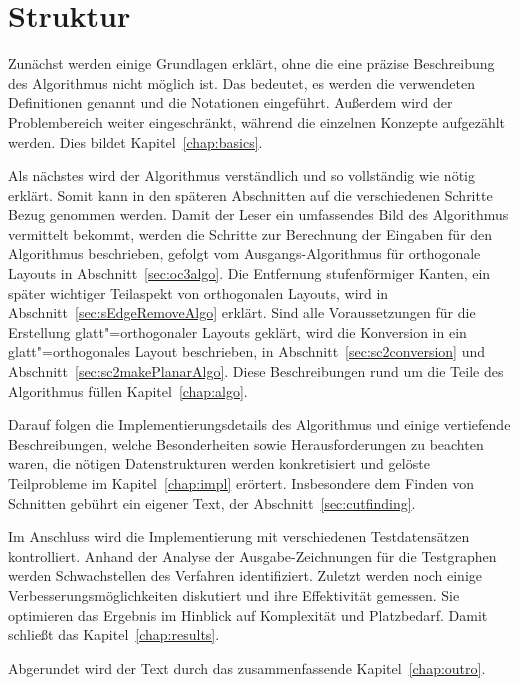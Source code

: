 \documentclass[a4paper]{scrreprt}
\theoremstyle{definition}
\begin{document}
\section{Struktur}

Zunächst werden einige Grundlagen erklärt, ohne die eine präzise Beschreibung des Algorithmus nicht möglich ist.  Das bedeutet, es werden die verwendeten Definitionen genannt und die Notationen eingeführt. Außerdem wird der Problembereich weiter eingeschränkt, während die einzelnen Konzepte aufgezählt werden. Dies bildet Kapitel~\ref{chap:basics}.

Als nächstes wird der Algorithmus verständlich und so vollständig wie nötig erklärt. Somit kann in den späteren Abschnitten auf die verschiedenen Schritte Bezug genommen werden. Damit der Leser ein umfassendes Bild des Algorithmus vermittelt bekommt, werden die Schritte zur Berechnung der Eingaben für den Algorithmus beschrieben, gefolgt vom Ausgangs-Algorithmus für orthogonale Layouts in Abschnitt~\ref{sec:oc3algo}. Die Entfernung stufenförmiger Kanten, ein später wichtiger Teilaspekt von orthogonalen Layouts, wird in Abschnitt~\ref{sec:sEdgeRemoveAlgo} erklärt. Sind alle Voraussetzungen für die Erstellung glatt"=orthogonaler Layouts geklärt, wird die Konversion in ein glatt"=orthogonales Layout beschrieben, in Abschnitt~\ref{sec:sc2conversion} und Abschnitt~\ref{sec:sc2makePlanarAlgo}. Diese Beschreibungen rund um die Teile des Algorithmus füllen Kapitel~\ref{chap:algo}.

Darauf folgen die Implementierungsdetails des Algorithmus und einige vertiefende Beschreibungen, welche Besonderheiten sowie Herausforderungen zu beachten waren, die nötigen Datenstrukturen werden konkretisiert und gelöste Teilprobleme im Kapitel~\ref{chap:impl} erörtert. Insbesondere dem Finden von Schnitten gebührt ein eigener Text, der Abschnitt~\ref{sec:cutfinding}.

Im Anschluss wird die Implementierung mit verschiedenen Testdatensätzen kontrolliert. Anhand der Analyse der Ausgabe-Zeichnungen für die Testgraphen werden Schwachstellen des Verfahren identifiziert. Zuletzt werden noch einige Verbesserungsmöglichkeiten diskutiert und ihre Effektivität gemessen. Sie optimieren das Ergebnis im Hinblick auf Komplexität und Platzbedarf. Damit schließt das Kapitel~\ref{chap:results}.

Abgerundet wird der Text durch das zusammenfassende Kapitel~\ref{chap:outro}.
\end{document}
